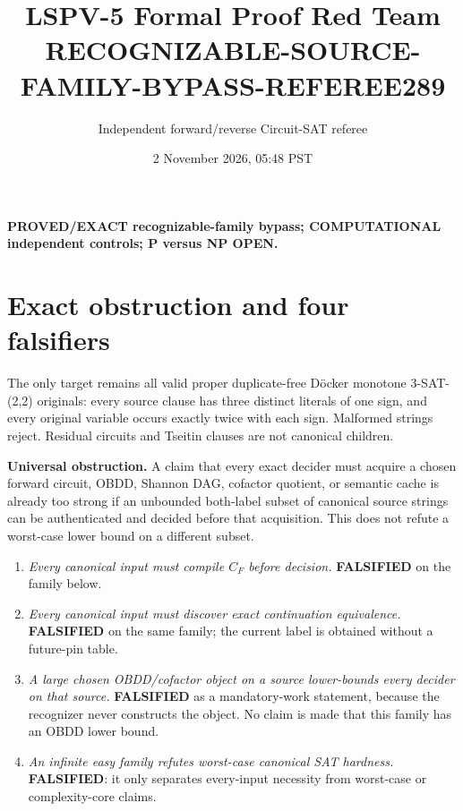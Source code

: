 \documentclass[11pt]{article}
\title{LSPV-5 Formal Proof Red Team\\RECOGNIZABLE-SOURCE-FAMILY-BYPASS-REFEREE289}
\author{Independent forward/reverse Circuit-SAT referee}
\date{2 November 2026, 05:48 PST}
\begin{document}
\maketitle

\noindent\textbf{PROVED/EXACT recognizable-family bypass; COMPUTATIONAL independent controls; P versus NP OPEN.}

\section{Exact obstruction and four falsifiers}
The only target remains all valid proper duplicate-free D\"ocker monotone
3-SAT-(2,2) originals: every source clause has three distinct literals of one
sign, and every original variable occurs exactly twice with each sign.
Malformed strings reject.  Residual circuits and Tseitin clauses are not
canonical children.

\textbf{Universal obstruction.}  A claim that every exact decider must acquire
a chosen forward circuit, OBDD, Shannon DAG, cofactor quotient, or semantic
cache is already too strong if an unbounded both-label subset of canonical
source strings can be authenticated and decided before that acquisition.
This does not refute a worst-case lower bound on a different subset.

\begin{enumerate}
\item \emph{Every canonical input must compile $C_F$ before decision.}
  \textbf{FALSIFIED} on the family below.
\item \emph{Every canonical input must discover exact continuation
  equivalence.}  \textbf{FALSIFIED} on the same family; the current label is
  obtained without a future-pin table.
\item \emph{A large chosen OBDD/cofactor object on a source lower-bounds every
  decider on that source.}  \textbf{FALSIFIED} as a mandatory-work statement,
  because the recognizer never constructs the object.  No claim is made that
  this family has an OBDD lower bound.
\item \emph{An infinite easy family refutes worst-case canonical SAT
  hardness.}  \textbf{FALSIFIED}: it only separates every-input necessity from
  worst-case or complexity-core claims.
\end{enumerate}
\end{document}
